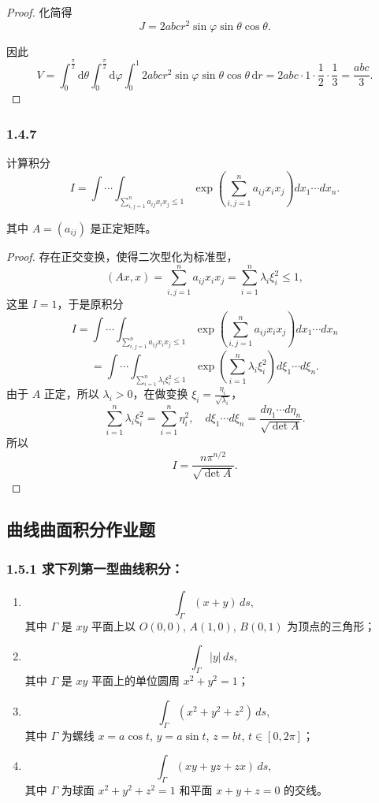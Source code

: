 \documentclass[12pt]{ctexart}
\begin{document}
\begin{proof}
化简得
\[
J = 2abcr^2 \sin\varphi \sin\theta \cos\theta.
\]

因此
\[
V = \int_{0}^{\frac{\pi}{2}} \mathrm{d}\theta \int_{0}^{\frac{\pi}{2}} \mathrm{d}\varphi \int_{0}^{1} 2abcr^2 \sin\varphi \sin\theta \cos\theta \, \mathrm{d}r 
= 2abc \cdot 1 \cdot \frac{1}{2} \cdot \frac{1}{3} = \frac{abc}{3}.
\]
\end{proof}

\subsubsection*{1.4.7}
计算积分
\[
I = \int \cdots \int_{\sum_{i,j=1}^n a_{ij}x_i x_j \leq 1} \exp \left( \sum_{i,j=1}^n a_{ij}x_i x_j \right) dx_1 \cdots dx_n.
\]

其中 $A = (a_{ij})$ 是正定矩阵。

\begin{proof}
存在正交变换，使得二次型化为标准型，
\[
(Ax, x) = \sum_{i,j=1}^n a_{ij}x_i x_j = \sum_{i=1}^n \lambda_i \xi_i^2 \leq 1,
\]
这里 $I = 1$，于是原积分
\[
I = \int \cdots \int_{\sum_{i,j=1}^n a_{ij}x_i x_j \leq 1} \exp \left( \sum_{i,j=1}^n a_{ij}x_i x_j \right) dx_1 \cdots dx_n
\]
\[
= \int \cdots \int_{\sum_{i=1}^n \lambda_i \xi_i^2 \leq 1} \exp \left( \sum_{i=1}^n \lambda_i \xi_i^2 \right) d\xi_1 \cdots d\xi_n.
\]
由于 $A$ 正定，所以 $\lambda_i > 0$，在做变换 $\xi_i = \frac{\eta_i}{\sqrt{\lambda_i}}$，
\[
\sum_{i=1}^n \lambda_i \xi_i^2 = \sum_{i=1}^n \eta_i^2, \quad d\xi_1 \cdots d\xi_n = \frac{d\eta_1 \cdots d\eta_n}{\sqrt{\det A}}.
\]
所以
\[
I = \frac{n\pi^{n/2}}{\sqrt{\det A}}.
\]
\end{proof}

\subsection{曲线曲面积分作业题}
\subsubsection*{1.5.1 求下列第一型曲线积分：}
\begin{enumerate}
    \item \[
        \int_{\Gamma} (x + y) \, ds,
        \]
        其中 $\Gamma$ 是 $xy$ 平面上以 $O(0,0)$, $A(1,0)$, $B(0,1)$ 为顶点的三角形；

    \item \[
        \int_{\Gamma} |y| \, ds,
        \]
        其中 $\Gamma$ 是 $xy$ 平面上的单位圆周 $x^2 + y^2 = 1$；

    \item \[
        \int_{\Gamma} (x^2 + y^2 + z^2) \, ds,
        \]
        其中 $\Gamma$ 为螺线 $x = a \cos t$, $y = a \sin t$, $z = bt$, $t \in [0, 2\pi]$；

    \item \[
        \int_{\Gamma} (xy + yz + zx) \, ds,
        \]
        其中 $\Gamma$ 为球面 $x^2 + y^2 + z^2 = 1$ 和平面 $x + y + z = 0$ 的交线。
\end{enumerate}
\end{document}
